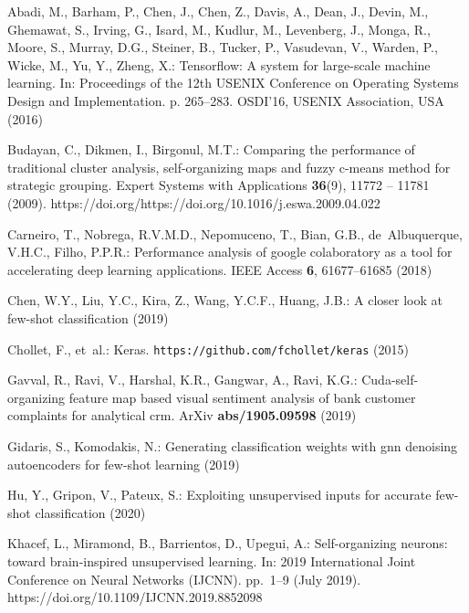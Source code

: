 \documentclass[runningheads]{llncs}
\begin{document}
\begin{thebibliography}{10}
\providecommand{\url}[1]{\texttt{#1}}
\providecommand{\urlprefix}{URL }
\providecommand{\doi}[1]{https://doi.org/#1}

Abadi, M., Barham, P., Chen, J., Chen, Z., Davis, A., Dean, J., Devin, M.,
  Ghemawat, S., Irving, G., Isard, M., Kudlur, M., Levenberg, J., Monga, R.,
  Moore, S., Murray, D.G., Steiner, B., Tucker, P., Vasudevan, V., Warden, P.,
  Wicke, M., Yu, Y., Zheng, X.: Tensorflow: A system for large-scale machine
  learning. In: Proceedings of the 12th USENIX Conference on Operating Systems
  Design and Implementation. p. 265–283. OSDI’16, USENIX Association, USA
  (2016)

Budayan, C., Dikmen, I., Birgonul, M.T.: Comparing the performance of
  traditional cluster analysis, self-organizing maps and fuzzy c-means method
  for strategic grouping. Expert Systems with Applications  \textbf{36}(9),
  11772 -- 11781 (2009). \doi{https://doi.org/10.1016/j.eswa.2009.04.022}

Carneiro, T., Nobrega, R.V.M.D., Nepomuceno, T., Bian, G.B., de~Albuquerque,
  V.H.C., Filho, P.P.R.: Performance analysis of google colaboratory as a tool
  for accelerating deep learning applications. IEEE Access  \textbf{6},
  61677--61685 (2018)

Chen, W.Y., Liu, Y.C., Kira, Z., Wang, Y.C.F., Huang, J.B.: A closer look at
  few-shot classification (2019)

Chollet, F., et~al.: Keras. \url{https://github.com/fchollet/keras} (2015)

Gavval, R., Ravi, V., Harshal, K.R., Gangwar, A., Ravi, K.G.:
  Cuda-self-organizing feature map based visual sentiment analysis of bank
  customer complaints for analytical crm. ArXiv  \textbf{abs/1905.09598} (2019)

Gidaris, S., Komodakis, N.: Generating classification weights with gnn
  denoising autoencoders for few-shot learning (2019)

Hu, Y., Gripon, V., Pateux, S.: Exploiting unsupervised inputs for accurate
  few-shot classification (2020)

{Khacef}, L., {Miramond}, B., {Barrientos}, D., {Upegui}, A.: Self-organizing
  neurons: toward brain-inspired unsupervised learning. In: 2019 International
  Joint Conference on Neural Networks (IJCNN). pp.~1--9 (July 2019).
  \doi{10.1109/IJCNN.2019.8852098}


\end{thebibliography}
\end{document}
